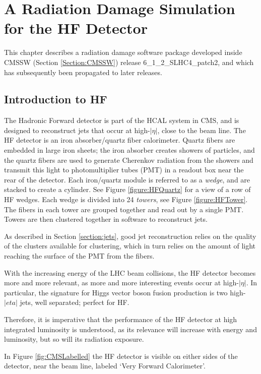 
\chapter{A Radiation Damage Simulation for the HF Detector} \label{chapter:HFRaddam}
 This chapter describes a radiation damage software package developed inside CMSSW (Section \ref{Section:CMSSW}) release 6\_1\_2\_SLHC4\_patch2, and which has subsequently been propagated to later releases.

	\section{Introduction to HF}
		The Hadronic Forward detector is part of the HCAL system in CMS, and is designed to reconstruct jets that occur at high-$|\eta|$, close to the beam line.  The HF detector is an iron absorber/quartz fiber calorimeter.  Quartz fibers are embedded in large iron sheets;  the iron absorber creates showers of particles, and the quartz fibers are used to generate Cherenkov radiation from the showers and transmit this light to photomultiplier tubes (PMT) in a readout box near the rear of the detector.  Each iron/quartz module is referred to as a \textit{wedge}, and are stacked to create a cylinder.  See Figure \ref{figure:HFQuartz} for a view of a row of HF wedges.  Each wedge is divided into 24 \textit{towers}, see Figure \ref{figure:HFTower}.  The fibers in each tower are grouped together and read out by a single PMT.  Towers are then clustered together in software to reconstruct jets.
		
		As described in Section \ref{section:jets}, good jet reconstruction relies on the quality of the clusters available for clustering, which in turn relies on the amount of light reaching the surface of the PMT from the fibers.
		
		With the increasing energy of the LHC beam collisions, the HF detector becomes more and more relevant, as more and more interesting events occur at high-$|\eta|$.  In particular, the signature for Higgs vector boson fusion production is two high-$|eta|$ jets, well separated; perfect for HF.
		
		Therefore, it is imperative that the performance of the HF detector at high integrated luminosity is understood, as its relevance will increase with energy and luminosity, but so will its radiation exposure.
		
		In Figure \ref{fig:CMSLabelled} the HF detector is visible on either sides of the detector, near the beam line, labeled `Very Forward Calorimeter'.
	
